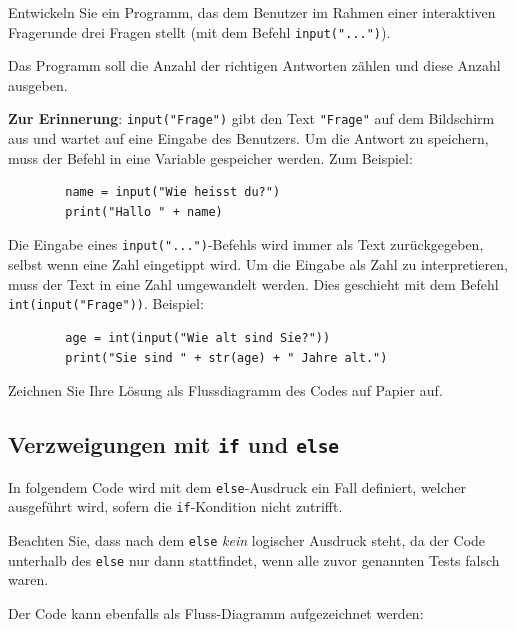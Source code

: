\begin{myexercise}
	Entwickeln Sie ein Programm, das dem Benutzer im Rahmen einer interaktiven Fragerunde drei Fragen stellt (mit dem Befehl \lstinline|input("...")|).

	Das Programm soll die Anzahl der richtigen Antworten
	zählen und diese Anzahl ausgeben.

	\textbf{Zur Erinnerung}: \lstinline|input("Frage")| gibt den Text \lstinline|"Frage"| auf dem Bildschirm aus und wartet auf eine Eingabe des Benutzers. Um die Antwort zu speichern, muss der Befehl in eine Variable gespeicher werden. Zum Beispiel:

	\begin{lstlisting}
		name = input("Wie heisst du?")
		print("Hallo " + name)
	\end{lstlisting}

	Die Eingabe eines \lstinline|input("...")|-Befehls wird immer als Text zurückgegeben, selbst wenn eine Zahl eingetippt wird. Um die Eingabe als Zahl zu interpretieren, muss der Text in eine Zahl umgewandelt werden. Dies geschieht mit dem Befehl \lstinline|int(input("Frage"))|. Beispiel:

	\begin{lstlisting}
		age = int(input("Wie alt sind Sie?"))
		print("Sie sind " + str(age) + " Jahre alt.")
	\end{lstlisting}

	Zeichnen Sie Ihre Lösung als Flussdiagramm des Codes auf Papier auf.
	\begin{myanswer}
		
	\end{myanswer}
\end{myexercise}


\subsection{Verzweigungen mit \texorpdfstring{\lstinline|if|}{if} und \texorpdfstring{\lstinline|else|}{else}}

\begin{myexample}
In folgendem Code wird mit dem \lstinline|else|-Ausdruck ein Fall definiert, welcher ausgeführt wird, sofern die \lstinline|if|-Kondition nicht zutrifft.


Beachten Sie, dass nach dem \lstinline|else| \textit{kein} logischer Ausdruck steht, da der Code unterhalb des \lstinline|else| nur dann stattfindet, wenn alle zuvor genannten Tests falsch waren.

Der Code kann ebenfalls als Fluss-Diagramm aufgezeichnet werden:
\begin{figure}[H]
	\centering
	
\end{figure}
\end{myexample}

